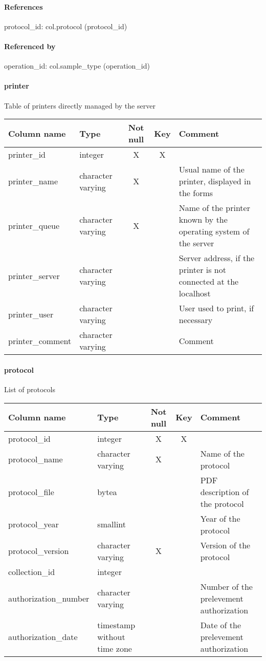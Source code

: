 \paragraph{References}
protocol\_id: col.protocol (protocol\_id)

\paragraph{Referenced by}
operation\_id: col.sample\_type (operation\_id)

\paragraph{printer}
Table of printers directly managed by the server

\begin{tabular}{|l| p{2cm}|c|c| p{5cm}|}
\hline
Column name & Type & Not null & Key & Comment \\
\hline
printer\_id & integer & X & X & \\
printer\_name & character varying & X &  & Usual name of the printer, displayed in the forms\\
printer\_queue & character varying & X &  & Name of the printer known by the operating system of the server\\
printer\_server & character varying &  &  & Server address, if the printer is not connected at the localhost\\
printer\_user & character varying &  &  & User used to print, if necessary\\
printer\_comment & character varying &  &  & Comment\\
\hline
\end{tabular}
\paragraph{protocol}
List of protocols

\begin{tabular}{|l| p{2cm}|c|c| p{5cm}|}
\hline
Column name & Type & Not null & Key & Comment \\
\hline
protocol\_id & integer & X & X & \\
protocol\_name & character varying & X &  & Name of the protocol\\
protocol\_file & bytea &  &  & PDF description of the protocol\\
protocol\_year & smallint &  &  & Year of the protocol\\
protocol\_version & character varying & X &  & Version of the protocol\\
collection\_id & integer &  &  & \\
authorization\_number & character varying &  &  & Number of the prelevement authorization\\
authorization\_date & timestamp without time zone &  &  & Date of the prelevement authorization\\
\hline
\end{tabular}
